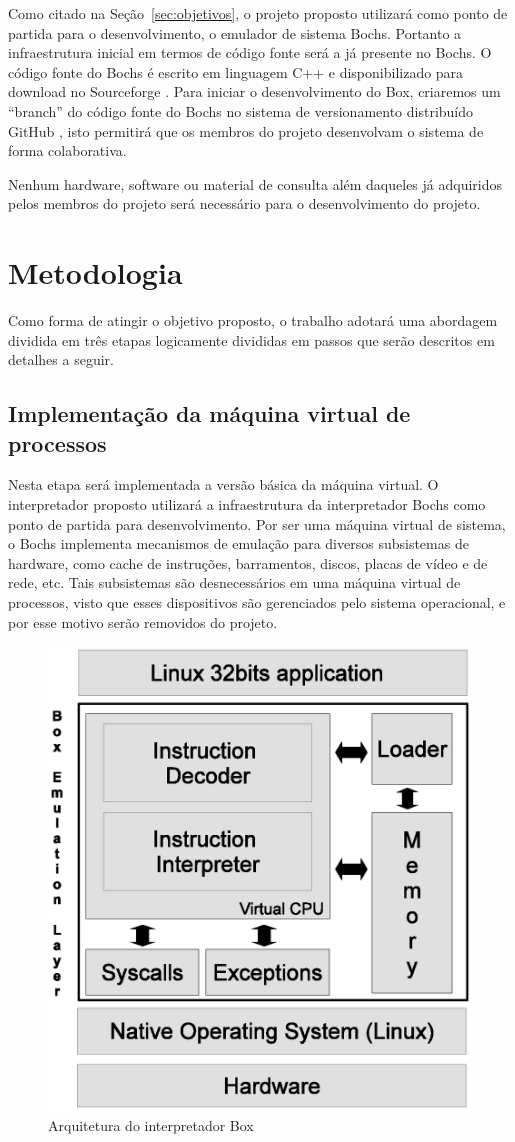 \documentclass[11pt,twoside]{article}
\begin{document}
Como citado na Seção~\ref{sec:objetivos}, o projeto proposto utilizará como
ponto de partida para o desenvolvimento, o emulador de sistema Bochs. Portanto 
a infraestrutura inicial em termos de código fonte será a já presente no Bochs. 
O código fonte do Bochs é escrito em linguagem C++ e disponibilizado para download
no Sourceforge \cite{bochs_site}. Para iniciar o desenvolvimento do Box, criaremos
um ``branch'' do código fonte do Bochs no sistema de versionamento distribuído
GitHub \cite{github}, isto permitirá que os membros do projeto desenvolvam o sistema
de forma colaborativa.

Nenhum hardware, software ou material de consulta além daqueles já adquiridos 
pelos membros do projeto será necessário para o desenvolvimento do projeto.

\section{Metodologia}

Como forma de atingir o objetivo proposto, o trabalho adotará uma abordagem dividida em três etapas logicamente divididas em passos que serão descritos em detalhes a seguir.

\subsection{Implementação da máquina virtual de processos}

Nesta etapa será implementada a versão básica da máquina virtual.
O interpretador proposto utilizará a infraestrutura da interpretador Bochs como ponto de partida para desenvolvimento. 
Por ser uma máquina virtual de sistema, o Bochs implementa mecanismos de emulação para diversos subsistemas de hardware, como cache de instruções, barramentos, discos, placas de vídeo e de rede, etc.
Tais subsistemas são desnecessários em uma máquina virtual de processos, visto que esses dispositivos são gerenciados pelo sistema operacional, e por esse motivo serão removidos do projeto.

\begin{figure}[h]
 \centering
 \includegraphics[width=0.5\columnwidth]{./figures/box-architecture.eps}
 \caption{Arquitetura do interpretador Box}
 \label{fig:box-architecture}
\end{figure}
\end{document}
